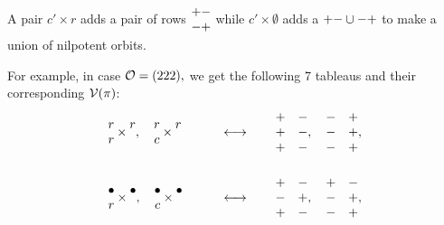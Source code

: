 \documentclass[11pt ,reqno]{amsart}
\begin{document}
A pair $c'\times r$ adds a pair of rows $\begin{matrix} +-\\-+\end{matrix}$ while
$c'\times \emptyset$ adds a $\begin{matrix} +-\end{matrix}\cup\begin{matrix} -+\end{matrix}$ to make a
union of nilpotent orbits.

For example, in case $\mathcal O=(222),$ we get the following
7 tableaus and their corresponding ${\mathcal V}(\pi)$:
\begin{alignat}{2}
&\begin{matrix} r\\ r\end{matrix}\times \begin{matrix} r\\ \ \end{matrix},\quad 
\begin{matrix} r\\ c\end{matrix}\times \begin{matrix} r\\ \ \end{matrix}
&&\qquad\longleftrightarrow\qquad
\begin{matrix} +&-\\ +&-\\ +&-\end{matrix},\quad \begin{matrix} -&+\\ -&+ \\
-&+\end{matrix},\label{3.2.6a}\\
\noalign{\bigskip}
&\begin{matrix} \bullet\\ r\end{matrix}\times \begin{matrix} \bullet\\ \ \end{matrix},\quad
\begin{matrix} \bullet\\ c\end{matrix}\times \begin{matrix}\bullet\\ \ \end{matrix}
&&\qquad\longleftrightarrow\qquad
\begin{matrix} +&-\\ -&+\\ +&-\end{matrix},\quad \begin{matrix} +&-\\ -&+\\ -&+\end{matrix},

\end{alignat}
\end{document}
